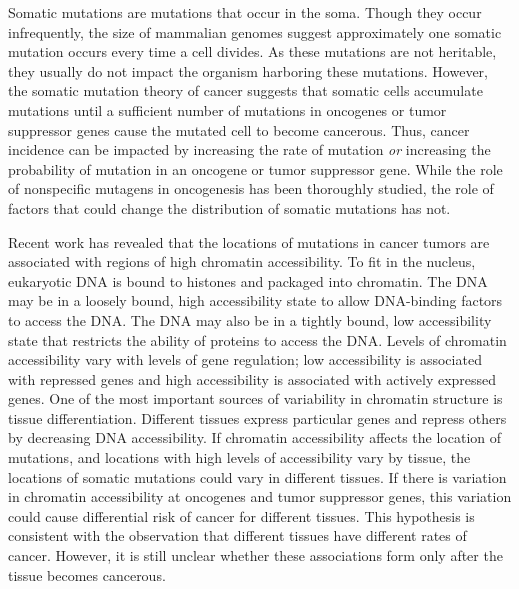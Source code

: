 
Somatic mutations are mutations that occur in the soma.
Though they occur infrequently, the size of mammalian genomes suggest approximately one somatic mutation occurs every time a cell divides.
As these mutations are not heritable, they usually do not impact the organism harboring these mutations.
However, the somatic mutation theory of cancer suggests that somatic cells accumulate mutations until a sufficient number of mutations in oncogenes or tumor suppressor genes cause the mutated cell to become cancerous.
Thus, cancer incidence can be impacted by increasing the rate of mutation \textit{or} increasing the probability of mutation in an oncogene or tumor suppressor gene.
While the role of nonspecific mutagens in oncogenesis has been thoroughly studied, the role of factors that could change the distribution of somatic mutations has not.

Recent work has revealed that the locations of mutations in cancer tumors are associated with regions of high chromatin accessibility.
To fit in the nucleus, eukaryotic DNA is bound to histones and packaged into chromatin.
The DNA may be in a loosely bound, high accessibility state to allow DNA-binding factors to access the DNA.
The DNA may also be in a tightly bound, low accessibility state that restricts the ability of proteins to access the DNA.
Levels of chromatin accessibility vary with levels of gene regulation; low accessibility is associated with repressed genes and high accessibility is associated with actively expressed genes.
One of the most important sources of variability in chromatin structure is tissue differentiation.
Different tissues express particular genes and repress others by decreasing DNA accessibility.
If chromatin accessibility affects the location of mutations, and locations with high levels of accessibility vary by tissue, the locations of somatic mutations could vary in different tissues.
If there is variation in chromatin accessibility at oncogenes and tumor suppressor genes, this variation could cause differential risk of cancer for different tissues.
This hypothesis is consistent with the observation that different tissues have different rates of cancer.
However, it is still unclear whether these associations form only after the tissue becomes cancerous. 

